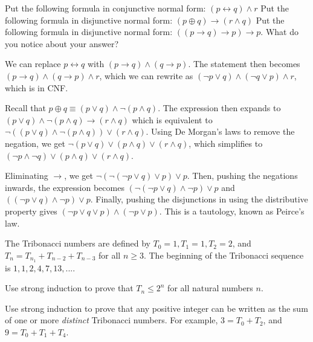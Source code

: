 \documentclass[solution, letterpaper]{cs20}
\begin{document}

\subproblem Put the following formula in conjunctive normal form: $(p \leftrightarrow q) \land r$
\subproblem Put the following formula in disjunctive normal form: $(p \oplus q) \rightarrow (r \land q)$
\subproblem Put the following formula in disjunctive normal form: $((p \rightarrow q) \rightarrow p) \rightarrow p$. What do you notice about your answer?

\begin{solution}
\subsolution  We can replace $p \leftrightarrow q$ with $(p \rightarrow q) \land (q \rightarrow p)$. The statement then becomes $(p \rightarrow q) \land (q \rightarrow p) \land r$, which we can rewrite as $(\lnot p \lor q) \land (\lnot q \lor p) \land r$, which is in CNF.

\subsolution Recall that $p \oplus q \equiv (p \lor q) \land \lnot (p \land q)$. The expression then expands to $(p \lor q) \land \lnot (p \land q) \rightarrow (r \land q)$ which is equivalent to $\lnot((p \lor q) \land \lnot (p \land q)) \lor (r \land q)$. Using De Morgan's laws to remove the negation, we get $\lnot (p \lor q) \lor (p \land q) \lor (r \land q)$, which simplifies to $(\lnot p \land \lnot q) \lor (p \land q) \lor (r \land q)$.

\subsolution Eliminating $\rightarrow$, we get $\lnot (\lnot (\lnot p \lor q) \lor p) \lor p$. Then, pushing the negations inwards, the expression becomes $(\lnot (\lnot p \lor q) \land \lnot p) \lor p$ and $((\lnot p \lor q) \land \lnot p) \lor p$. Finally, pushing the disjunctions in using the distributive property gives $(\lnot p \lor q \lor p) \land (\lnot p \lor p)$. This is a tautology, known as Peirce's law.

\end{solution}



The Tribonacci numbers are defined by $T_0 = 1, T_1 = 1, T_2 = 2$, and $T_n = T_{n_1} + T_{n-2} + T_{n-3}$ for all $n \ge 3$. The beginning of the Tribonacci sequence is $1, 1, 2, 4, 7, 13, ...$. 

\subproblem Use strong induction to prove that $T_n \le 2^n$ for all natural numbers $n$.

\subproblem Use strong induction to prove that any positive integer can be written as the sum of one or more \textit{distinct} Tribonacci numbers. For example, $3 = T_0 + T_2$, and $9 = T_0 + T_1 + T_4$.
\end{document}

